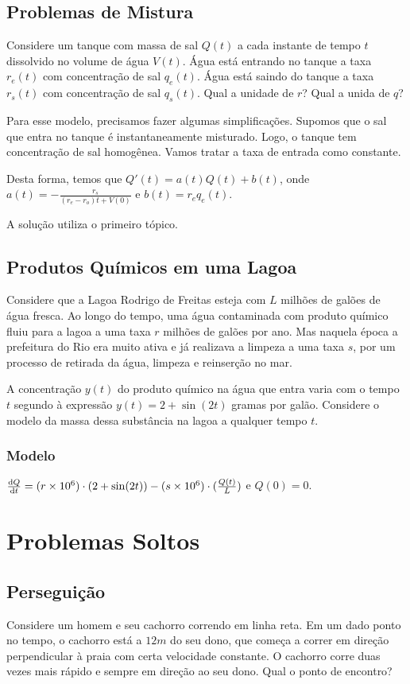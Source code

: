 \documentclass[12pt]{article}
\begin{document}
\subsection{Problemas de Mistura}

Considere um tanque com massa de sal $Q(t)$ a cada instante de tempo $t$
dissolvido no volume de água $V(t)$. Água está entrando no tanque a taxa
$r_e(t)$ com concentração de sal $q_e(t)$. Água está saindo do tanque a taxa
$r_s(t)$ com concentração de sal $q_s(t)$. Qual a unidade de $r$? Qual a unida
de $q$? 

Para esse modelo, precisamos fazer algumas simplificações. Supomos que o sal
que entra no tanque é instantaneamente misturado. Logo, o tanque tem
concentração de sal homogênea. Vamos tratar a taxa de entrada como constante. 

Desta forma, temos que $Q'(t) = a(t)Q(t) + b(t)$, onde $a(t) =
-\frac{r_s}{(r_e - r_o)t + V(0)}$ e $b(t) = r_eq_e(t)$.

A solução utiliza o primeiro tópico. 

\subsection{Produtos Químicos em uma Lagoa}

Considere que a Lagoa Rodrigo de Freitas esteja com $L$ milhões de galões de
água fresca. Ao longo do tempo, uma água contaminada com produto químico fluiu
para a lagoa a uma taxa $r$ milhões de galões por ano. Mas naquela época a
prefeitura do Rio era muito ativa e já realizava a limpeza a uma taxa $s$, por
um processo de retirada da água, limpeza e reinserção no mar. 

A concentração $y(t)$ do produto químico na água que entra varia com o tempo $t$ segundo
à expressão $y(t) = 2 + \sin (2t)$ gramas por galão. Considere o modelo da
massa dessa substância na lagoa a qualquer tempo $t$. 


\subsubsection{Modelo}

$\dv{Q}{t} = (r\times 10^6)\cdot (2 + \sin (2t)) - (s\times 10^6)\cdot
(\frac{Q(t)}{L})$ e $Q(0) = 0$. 

\section{Problemas Soltos}

\subsection{Perseguição}

Considere um homem e seu cachorro correndo em linha reta. Em um dado ponto no
tempo, o cachorro está a $12m$ do seu dono, que começa a correr em direção
perpendicular à praia com certa velocidade constante. O cachorro corre duas
vezes mais rápido e sempre em direção ao seu dono. Qual o ponto de encontro?
\end{document}
